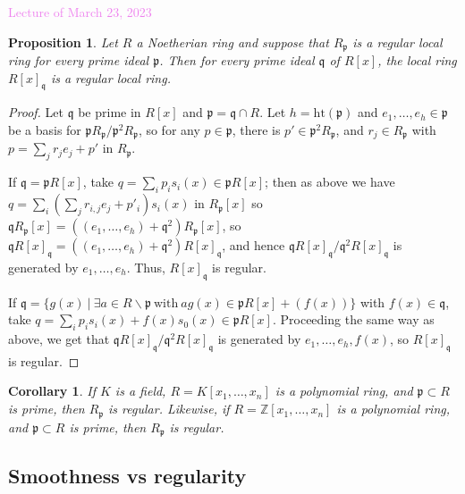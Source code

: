 \documentclass{amsart}[12pt]
\newcommand{\htt}{\mathrm{ht}}
\newcommand{\Mar}[1]{\textcolor{violet}{Lecture of March #1, 2023}}
\newcommand{\Z}{\mathbb{Z}}
\newcommand{\fp}{{\mathfrak p}}
\newcommand{\fq}{{\mathfrak q}}
\numberwithin{equation}{section}
\theoremstyle{plain} %
\newtheorem{cor}[equation]{Corollary}
\newtheorem{prop}[equation]{Proposition}
\theoremstyle{definition}
\theoremstyle{remark}
\begin{document}
\Mar{23}

\begin{prop} Let $R$ a Noetherian ring and suppose that $R_{\fp}$ is a regular local ring for every prime ideal $\fp$. Then for every prime ideal $\fq$ of $R[x]$, the local ring $R[x]_\fq$ is a regular local ring.
\end{prop}
\begin{proof}  Let $\fq$ be prime in $R[x]$ and $\fp=\fq \cap R$. Let $h=\htt(\fp)$ and $e_1,\dots,e_h\in\fp$ be a basis for $\fp R_\fp/ \fp^2 R_\fp$, so for any $p\in \fp$, there is $p'\in \fp^2 R_\fp$, and $r_j\in R_{\fp}$ with $p = \sum_j r_j e_j + p'$ in $R_\fp$.

If $\fq = \fp R[x]$, take $q = \sum_i p_i s_i(x) \in \fp R[x]$; then as above we have $q= \sum_i (\sum_j r_{i,j} e_j + p'_i) s_i(x)$ in $R_\fp[x]$ so $\fq R_{\fp}[x] = ((e_1,\dots,e_h) +\fq^2)R_{\fp}[x]$, so $\fq R[x]_{\fq} = ((e_1,\dots,e_h) +\fq^2)R[x]_{\fq}$, and hence $\fq R[x]_{\fq} / \fq^2 R[x]_{\fq}$ is generated by $e_1,\dots, e_h$. Thus, $R[x]_{\fq}$ is regular. 

 If $\fq = \{ g(x) \ | \ \exists a\in R\smallsetminus \fp \ \text{with} \ a g(x) \in \fp R[x]+(f(x))\}$ with $f(x)\in \fq$, take $q = \sum_i p_i s_i(x) + f(x) s_0(x) \in \fp R[x]$. Proceeding the same way as above, we get that $\fq R[x]_{\fq} / \fq^2 R[x]_{\fq}$ is generated by $e_1,\dots, e_h, f(x)$, so $R[x]_{\fq}$ is regular. 
\end{proof}

\begin{cor} If $K$ is a field, $R=K[x_1,\dots,x_n]$ is a polynomial ring, and $\fp\subset R$ is prime, then $R_\fp$ is regular. Likewise, if $R=\Z[x_1,\dots,x_n]$ is a polynomial ring, and $\fp\subset R$ is prime, then $R_\fp$ is regular.
\end{cor}



\subsection{Smoothness vs regularity}
\end{document}
